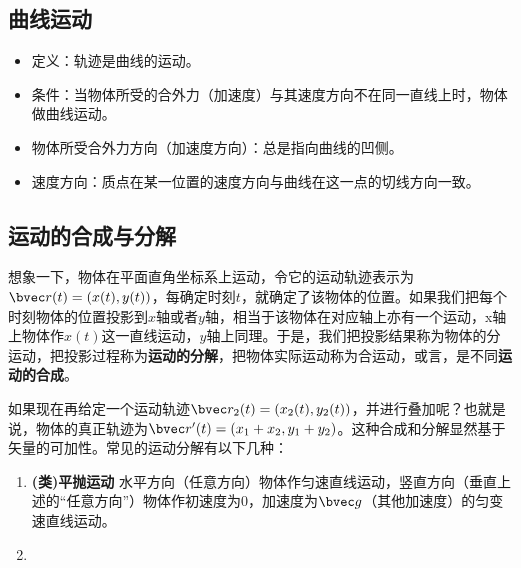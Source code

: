 

\subsection{曲线运动}

\begin{itemize}
\item 定义：轨迹是曲线的运动。
\item 条件：当物体所受的合外力（加速度）与其速度方向不在同一直线上时，物体做曲线运动。
\item 物体所受合外力方向（加速度方向）：总是指向曲线的凹侧。
\item 速度方向：质点在某一位置的速度方向与曲线在这一点的切线方向一致。
\end{itemize}

\subsection{运动的合成与分解}
想象一下，物体在平面直角坐标系上运动，令它的运动轨迹表示为$\bvec r(t)=(x(t),y(t))$，每确定时刻$t$，就确定了该物体的位置。如果我们把每个时刻物体的位置投影到$x$轴或者$y$轴，相当于该物体在对应轴上亦有一个运动，x轴上物体作$x(t)$这一直线运动，$y$轴上同理。于是，我们把投影结果称为物体的分运动，把投影过程称为\textbf{运动的分解}，把物体实际运动称为合运动，或言，是不同\textbf{运动的合成}。

如果现在再给定一个运动轨迹$\bvec r_2(t)=(x_2(t),y_2(t))$，并进行叠加呢？也就是说，物体的真正轨迹为$\bvec r'(t)=(x_1+x_2,y_1+y_2)$。这种合成和分解显然基于矢量的可加性。常见的运动分解有以下几种：
\begin{enumerate}
\item\textbf{ (类)平抛运动} 水平方向（任意方向）物体作匀速直线运动，竖直方向（垂直上述的“任意方向”）物体作初速度为$0$，加速度为$\bvec g$（其他加速度）的匀变速直线运动。
\item 
\end{enumerate}



